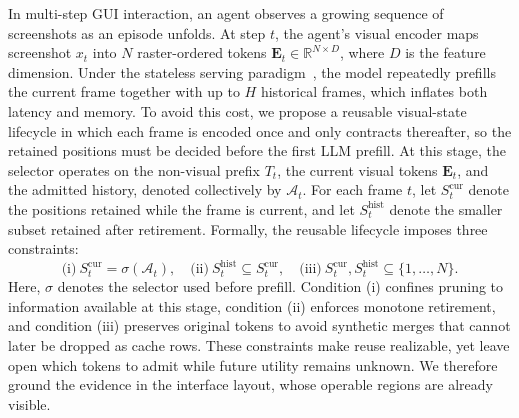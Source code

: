 In multi-step GUI interaction, an agent observes a growing sequence of screenshots as an episode unfolds. 
%
At step $t$, the agent's visual encoder maps screenshot $x_t$ into $N$ raster-ordered tokens $\mathbf{E}_t\in\mathbb{R}^{N\times D}$, where $D$ is the feature dimension.
%
Under the stateless serving paradigm~\citep{li2026aquaui}, the model repeatedly prefills the current frame together with up to $H$ historical frames, which inflates both latency and memory.
%
To avoid this cost, we propose a reusable visual-state lifecycle in which each frame is encoded once and only contracts thereafter, so the retained positions must be decided before the first LLM prefill.
%
At this stage, the selector operates on the non-visual prefix $T_t$, the current visual tokens $\mathbf{E}_t$, and the admitted history, denoted collectively by $\mathcal{A}_t$.
%
For each frame $t$, let $S_t^{\mathrm{cur}}$ denote the positions retained while the frame is current, and let $S_t^{\mathrm{hist}}$ denote the smaller subset retained after retirement.
%
Formally, the reusable lifecycle imposes three constraints:
\begin{equation}
\text{(i)}\ S_t^{\mathrm{cur}}=\sigma(\mathcal{A}_t),\quad
\text{(ii)}\ S_t^{\mathrm{hist}}\subseteq S_t^{\mathrm{cur}},\quad
\text{(iii)}\ S_t^{\mathrm{cur}},S_t^{\mathrm{hist}}\subseteq\{1,\ldots,N\}.
\label{eq:lifecycle}
\end{equation}
Here, $\sigma$ denotes the selector used before prefill.
%
Condition (i) confines pruning to information available at this stage, condition (ii) enforces monotone retirement, and condition (iii) preserves original tokens to avoid synthetic merges that cannot later be dropped as cache rows.
%
These constraints make reuse realizable, yet leave open which tokens to admit while future utility remains unknown.
%
We therefore ground the evidence in the interface layout, whose operable regions are already visible.

